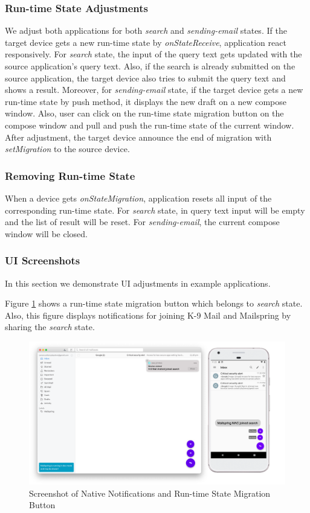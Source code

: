 \subsubsection{Run-time State Adjustments}
We adjust both applications for both \textit{search} and \textit{sending-email} states. If the target device gets a new run-time state by \textit{onStateReceive}, application react responsively. For \textit{search} state, the input of the query text gets updated with the source application's query text. Also, if the search is already submitted on the source application, the target device also tries to submit the query text and shows a result. Moreover, for \textit{sending-email} state, if the target device gets a new run-time state by push method, it displays the new draft on a new compose window. Also, user can click on the run-time state migration button on the compose window and pull and push the run-time state of the current window. After adjustment, the target device announce the end of migration with \textit{setMigration} to the source device.

\subsubsection{Removing Run-time State}
When a device gets \textit{onStateMigration}, application resets all input of the corresponding run-time state. For \textit{search} state, in query text input will be empty and the list of result will be reset. For \textit{sending-email}, the current compose window will be closed.

\subsubsection{UI Screenshots}
In this section we demonstrate UI adjustments in example applications.

Figure \ref{fig:adapt-noti} shows a run-time state migration button which belongs to \textit{search} state. Also, this figure displays notifications for joining K-9 Mail and Mailspring by sharing the \textit{search} state.


\FloatBarrier
\begin{figure}[H]
    \includegraphics[width=\linewidth]{../figures/adapt-noti.png}
    \centering
    \caption{Screenshot of Native Notifications and Run-time State Migration Button}
    \label{fig:adapt-noti}
\end{figure}
\FloatBarrier

